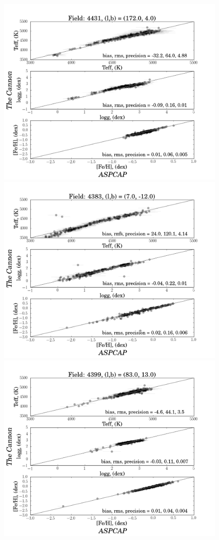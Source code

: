 \documentclass[12pt, preprint]{aastex}
\begin{document}
\begin{figure}[!h]
\centering
  \includegraphics[scale=0.23]{./plots/4431_v19.png}
    \includegraphics[scale=0.23]{./plots/4383_v19.png} \\
      \includegraphics[scale=0.23]{./plots/4399_v19.png}

\end{figure}
\end{document}
